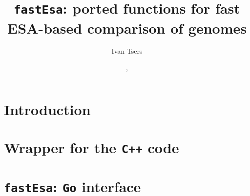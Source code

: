 \documentclass[a4paper]{article}
\begin{document}
\pagestyle{noweb}

\title{\texttt{fastEsa}: ported functions for fast ESA-based comparison of genomes}
\author{Ivan Tsers}
\date{, }
\maketitle

\tableofcontents

\section{Introduction}

\newpage
\section{Wrapper for the \texttt{C++} code}

\newpage
\section{\texttt{fastEsa}: \texttt{Go} interface}

\newpage
%


\end{document}
